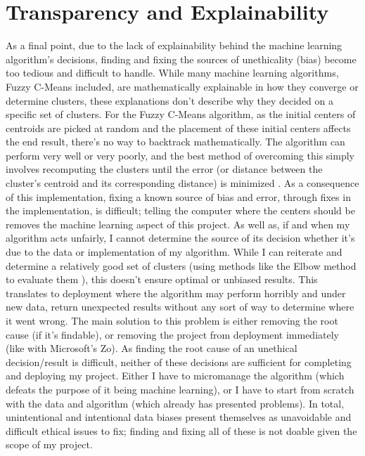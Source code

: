 \documentclass[10pt,twocolumn]{article}
\begin{document}
\section {Transparency and Explainability}

As a final point, due to the lack of explainability behind the machine learning algorithm’s decisions, finding and fixing the sources of unethicality (bias) become too tedious and difficult to handle. While many machine learning algorithms, Fuzzy C-Means included, are mathematically explainable in how they converge or determine clusters, these explanations don’t describe why they decided on a specific set of clusters. For the Fuzzy C-Means algorithm, as the initial centers of centroids are picked at random and the placement of these initial centers affects the end result, there’s no way to backtrack mathematically. The algorithm can perform very well or very poorly, and the best method of overcoming this simply involves recomputing the clusters until the error (or distance between the cluster’s centroid and its corresponding distance) is minimized \cite{GeeksForGeeks2019}. As a consequence of this implementation, fixing a known source of bias and error, through fixes in the implementation, is difficult; telling the computer where the centers should be removes the machine learning aspect of this project. As well as, if and when my algorithm acts unfairly, I cannot determine the source of its decision whether it’s due to the data or implementation of my algorithm. While I can reiterate and determine a relatively good set of clusters (using methods like the Elbow method to evaluate them \cite{PrasadClustering}), this doesn’t ensure optimal or unbiased results. This translates to deployment where the algorithm may perform horribly and under new data, return unexpected results without any sort of way to determine where it went wrong. The main solution to this problem is either removing the root cause (if it’s findable), or removing the project from deployment immediately (like with Microsoft’s Zo). As finding the root cause of an unethical decision/result is difficult, neither of these decisions are sufficient for completing and deploying my project. Either I have to micromanage the algorithm (which defeats the purpose of it being machine learning), or I have to start from scratch with the data and algorithm (which already has presented problems). In total, unintentional and intentional data biases present themselves as unavoidable and difficult ethical issues to fix; finding and fixing all of these is not doable given the scope of my project.


\printbibliography
 
\end{document}
